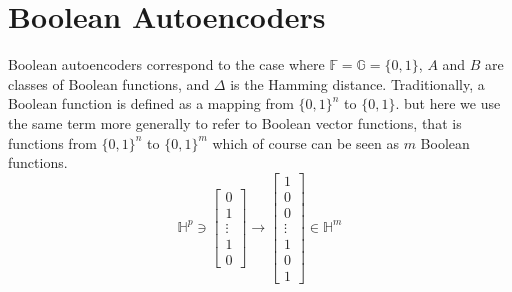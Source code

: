 \section{Boolean Autoencoders}
Boolean autoencoders correspond to the case where $\mathbb{F} = \mathbb{G} = \{0, 1\}$, $A$ and $B$ are classes of Boolean functions, and $\Delta$ is the Hamming distance. Traditionally, a Boolean function is defined as a mapping from $\{0, 1\}^n$ to $\{0, 1\}$. but here we use the same term more generally to refer to Boolean vector functions, that is functions from $\{0, 1\}^n$ to $\{0, 1\}^m$ which of course can be seen as $m$ Boolean functions. 
\[
    \mathbb{H}^p \ni \begin{bmatrix}
        0\\
        1\\
        \vdots\\
        1\\
        0
    \end{bmatrix}   \to 
    \begin{bmatrix}
        1\\
        0\\
        0\\
        \vdots\\
        1\\
        0\\
        1
    \end{bmatrix} \in \mathbb{H}^m
\]

